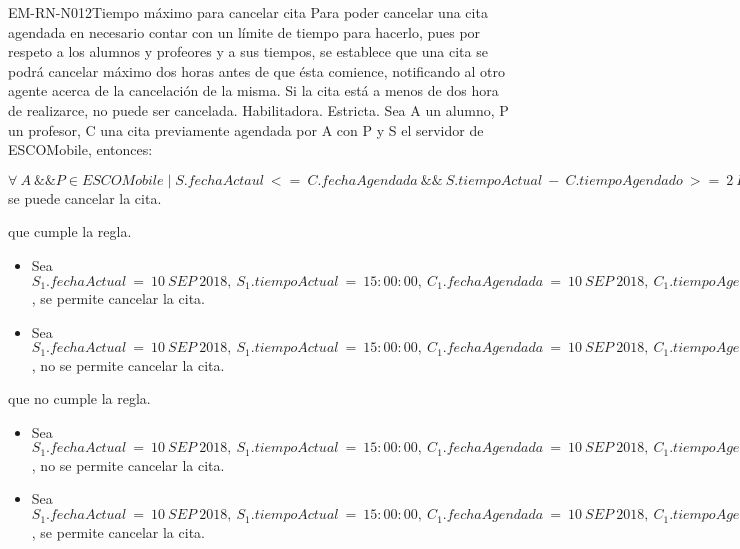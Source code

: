 \begin{BussinesRule}{EM-RN-N012}{Tiempo máximo para cancelar cita}
	\BRitem[Descripción:] Para poder cancelar una cita agendada en necesario contar con un límite de tiempo para hacerlo, pues por respeto a los alumnos y profeores y a sus tiempos, se establece que una cita se podrá cancelar máximo dos horas antes de que ésta comience, notificando al otro agente acerca de la cancelación de la misma. Si la cita está a menos de dos hora de realizarce, no puede ser cancelada.
	\BRitem[Tipo: ] Habilitadora.
	\BRitem[Nivel: ] Estricta.
	\BRitem[Sentenia: ] Sea A un alumno, P un profesor, C una cita previamente agendada por A con P y S el servidor de ESCOMobile, entonces:
	\begin{center}
		$\forall \: A \: \&\& P \in ESCOMobile \mid  S.fechaActaul \: <= \: C.fechaAgendada \: \&\& \: S.tiempoActual \: - \: C.tiempoAgendado \: >= \: 2 \: Horas \: \Rightarrow$ se puede cancelar la cita.
	\end{center}
	 que cumple la regla.
		\begin{itemize}
			\item Sea $S_{1}.fechaActual \: = \: 10 \: SEP \: 2018, \: S_{1}.tiempoActual \: = \: 15:00:00, \: C_{1}.fechaAgendada \: = \: 10 \: SEP \: 2018, \: C_{1}.tiempoAgendado \: = \: 12:00:00$, se permite
			cancelar la cita.
			\item Sea $S_{1}.fechaActual \: = \: 10 \: SEP \: 2018, \: S_{1}.tiempoActual \: = \: 15:00:00, \: C_{1}.fechaAgendada \: = \: 10 \: SEP \: 2018, \: C_{1}.tiempoAgendado \: = \: 14:00:00$, no se permite
			cancelar la cita.
		\end{itemize}
	 que no cumple la regla.
		\begin{itemize}
			\item Sea $S_{1}.fechaActual \: = \: 10 \: SEP \: 2018, \: S_{1}.tiempoActual \: = \: 15:00:00, \: C_{1}.fechaAgendada \: = \: 10 \: SEP \: 2018, \: C_{1}.tiempoAgendado \: = \: 12:00:00$, no se permite
			cancelar la cita.
			\item Sea $S_{1}.fechaActual \: = \: 10 \: SEP \: 2018, \: S_{1}.tiempoActual \: = \: 15:00:00, \: C_{1}.fechaAgendada \: = \: 10 \: SEP \: 2018, \: C_{1}.tiempoAgendado \: = \: 14:00:00$, se permite
			cancelar la cita.
		\end{itemize}

\end{BussinesRule}



